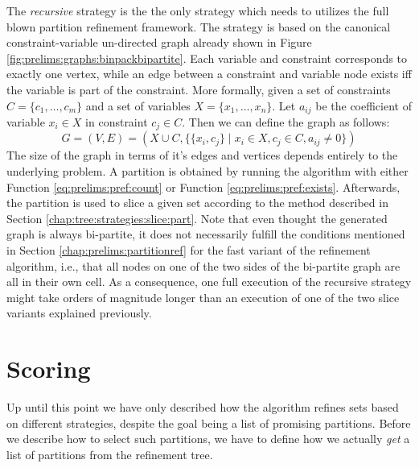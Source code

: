 			The \textit{recursive} strategy is the the only strategy which needs to utilizes the full blown partition refinement framework.
			The strategy is based on the canonical constraint-variable un-directed graph already shown in Figure \ref{fig:prelims:graphs:binpackbipartite}.
			Each variable and constraint corresponds to exactly one vertex, while an edge between a constraint and variable node exists iff the variable is part of the constraint.
			More formally, given a set of constraints $C = \{ c_1, \ldots, c_m \}$ and a set of variables $X = \{ x_1, \ldots, x_n \}$. Let $a_{ij}$ be the coefficient of variable $x_i \in X$ in constraint $c_j \in C$.
			Then we can define the graph as follows:
			\begin{equation*}
				G = (V, E) = (X \cup C, \{ \{ x_i, c_j \} \mid x_i \in X, c_j \in C, a_{ij} \neq 0 \})
			\end{equation*}
			The size of the graph in terms of it's edges and vertices depends entirely to the underlying problem. 
			A partition is obtained by running the algorithm with either Function \ref{eq:prelims:pref:count} or Function \ref{eq:prelims:pref:exists}.
			Afterwards, the partition is used to slice a given set according to the method described in Section \ref{chap:tree:strategies:slice:part}.
			Note that even thought the generated graph is always bi-partite, it does not necessarily fulfill the conditions mentioned in Section \ref{chap:prelims:partitionref} for the fast variant of the refinement algorithm, i.e., that all nodes on one of the two sides of the bi-partite graph are all in their own cell.
			As a consequence, one full execution of the recursive strategy might take orders of magnitude longer than an execution of one of the two slice variants explained previously. 
			
			\clearpage
	
	\section{Scoring}
	\label{chap:gcg:scoring}
	
		Up until this point we have only described how the algorithm refines sets based on different strategies, despite the goal being a list of promising partitions.
		Before we describe how to select such partitions, we have to define how we actually \textit{get} a list of partitions from the refinement tree.
		
